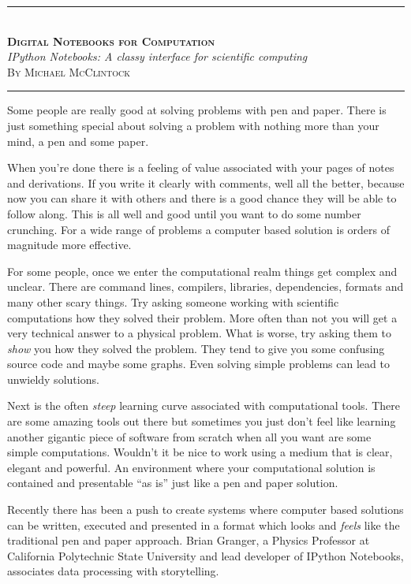 \documentclass[11pt, a4paper]{article}  %
\begin{document}
\begin{center}
    \rule[0.5ex]{1\columnwidth}{1pt}
    \\[4mm]
    \textbf{\textsc{\Huge Digital Notebooks for Computation}}
    \\[6mm]
    \textit{\Large IPython Notebooks: A classy interface for scientific
    computing}
    \\[6mm]
    \textsc{\large By Michael McClintock}
    \\[4mm]
    \rule[0.5ex]{1\columnwidth}{1pt}
\end{center}

\begin{multicols}{2}

Some people are really good at solving problems with pen and paper. There is
just something special about solving a problem with nothing more than your
mind, a pen and some paper.

When you're done there is a feeling of value associated with your pages of
notes and derivations. If you write it clearly with comments, well all the
better, because now you can share it with others and there is a good chance
they will be able to follow along. This is all well and good until you want to
do some number crunching. For a wide range of problems a computer based
solution is orders of magnitude more effective.

For some people, once we enter the computational realm things get complex and
unclear. There are command lines, compilers, libraries, dependencies, formats
and many other scary things. Try asking someone working with scientific
computations how they solved their problem. More often than not you will get a
very technical answer to a physical problem. What is worse, try asking them to
\emph{show} you how they solved the problem. They tend to give you some
confusing source code and maybe some graphs. Even solving simple problems can
lead to unwieldy solutions.

Next is the often \emph{steep} learning curve associated with computational
tools. There are some amazing tools out there but sometimes you just don't
feel like learning another gigantic piece of software from scratch when all
you want are some simple computations. Wouldn't it be nice to work using a
medium that is clear, elegant and powerful. An environment where your
computational solution is contained and presentable ``as is'' just like a pen
and paper solution.

Recently there has been a push to create systems where computer based
solutions can be written, executed and presented in a format which looks and
\emph{feels} like the traditional pen and paper approach. Brian Granger, a
Physics Professor at California Polytechnic State University and lead
developer of IPython Notebooks, associates data processing with storytelling.
\cite{granger}


\end{multicols}
\end{document}
